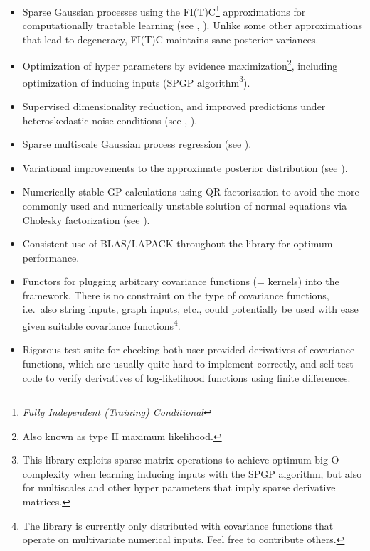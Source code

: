 \documentclass[10pt]{article}
\begin{document}
\begin{itemize}

\item Sparse Gaussian processes using the FI(T)C\footnote{\emph{Fully
Independent (Training) Conditional}} approximations for computationally
tractable learning (see \cite{conf/nips/2005}, \cite{SnelsonThesis}).
Unlike some other approximations that lead to degeneracy, FI(T)C
maintains sane posterior variances.

\item Optimization of hyper parameters by evidence
maximization\footnote{Also known as type II maximum likelihood.},
including optimization of inducing inputs (SPGP algorithm\footnote{This
library exploits sparse matrix operations to achieve optimum big-O
complexity when learning inducing inputs with the SPGP algorithm,
but also for multiscales and other hyper parameters that imply
sparse derivative matrices.}).

\item Supervised dimensionality reduction, and improved predictions
under heteroskedastic noise conditions (see \cite{conf/uai/SnelsonG06},
\cite{SnelsonThesis}).

\item Sparse multiscale Gaussian process regression (see
\cite{conf/icml/WalderKS08}).

\item Variational improvements to the approximate posterior
distribution (see \cite{Titsias2009}).

\item Numerically stable GP calculations using QR-factorization to
avoid the more commonly used and numerically unstable solution of
normal equations via Cholesky factorization (see \cite{Foster2009}).

\item Consistent use of BLAS/LAPACK throughout the library for
optimum performance.

\item Functors for plugging arbitrary covariance functions (=
kernels) into the framework.  There is no constraint on the type
of covariance functions, i.e.\ also string inputs, graph inputs,
etc., could potentially be used with ease given suitable covariance
functions\footnote{The library is currently only distributed with
covariance functions that operate on multivariate numerical inputs.
Feel free to contribute others.}.

\item Rigorous test suite for checking both user-provided derivatives
of covariance functions, which are usually quite hard to implement
correctly, and self-test code to verify derivatives of log-likelihood
functions using finite differences.

\end{itemize}
\end{document}

